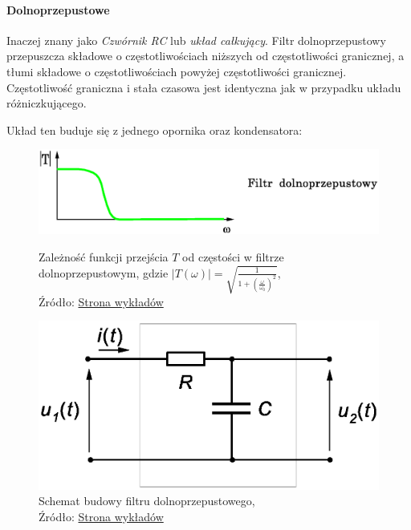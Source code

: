 \documentclass{article}
\begin{document}
          \paragraph{Dolnoprzepustowe}
            \mbox{}\newline
            Inaczej znany jako \textit{Czwórnik RC} lub \textit{układ całkujący}. Filtr dolnoprzepustowy przepuszcza składowe o częstotliwościach niższych od częstotliwości granicznej, a tłumi składowe o częstotliwościach powyżej częstotliwości granicznej.
            Częstotliwość graniczna i stała czasowa jest identyczna jak w przypadku układu różniczkującego.

            Układ ten buduje się z jednego opornika oraz kondensatora:
            \begin{figure}[!ht]
              \centering
              \begin{minipage}{.4\textwidth}
                \centering
                \includegraphics[scale=0.40]{grafiki/dolnoprzepustowy.eps}
                \caption{Zależność funkcji przejścia $T$ od częstości w filtrze dolnoprzepustowym, gdzie $|T(\omega)| = \sqrt{\frac{1}{1+(\frac{\omega}{\omega_0})^2}}$,
                \\Źródło: \href{https://spe.if.uj.edu.pl/literatura}{Strona wykładów}}
                \label{fig2:dolnoprzepustowy}
              \end{minipage}
              \begin{minipage}{.4\textwidth}
                \centering
                \includegraphics[scale=0.40]{grafiki/czwornik_RC.eps}
                \caption{Schemat budowy filtru dolnoprzepustowego,
                \\Źródło: \href{https://spe.if.uj.edu.pl/literatura}{Strona wykładów}}
                \label{fig3:dolnoprzepustowy_2}
              \end{minipage}
            \end{figure}
\end{document}
